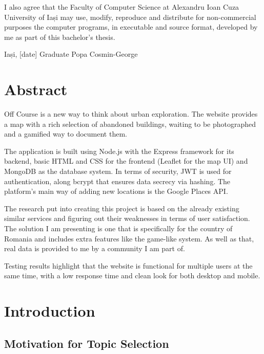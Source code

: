 \documentclass[12pt,a4paper]{report}
\begin{document}
I also agree that the Faculty of Computer Science at Alexandru Ioan Cuza University of Iași may use, modify, reproduce and distribute for non-commercial purposes the computer programs, in executable and source format, developed by me as part of this bachelor's thesis.

\vspace{2cm}
Iași, [date] \hfill Graduate Popa Cosmin-George

\newpage

\tableofcontents
\newpage

\chapter*{Abstract}

Off Course is a new way to think about urban exploration. The website provides a map with a rich selection of abandoned buildings, waiting to be photographed and a gamified way to document them.

The application is built using Node.js with the Express framework for its backend, basic HTML and CSS for the frontend (Leaflet for the map UI) and MongoDB as the database system. In terms of security, JWT is used for authentication, along bcrypt that ensures data secrecy via hashing. The platform's main way of adding new locations is the Google Places API.

The research put into creating this project is based on the already existing similar services and figuring out their weaknesses in terms of user satisfaction. The solution I am presenting is one that is specifically for the country of Romania and includes extra features like the game-like system. As well as that, real data is provided to me by a community I am part of.

Testing results highlight that the website is functional for multiple users at the same time, with a low response time and clean look for both desktop and mobile.

\newpage

\chapter*{Introduction}

\section*{Motivation for Topic Selection}
\end{document}
